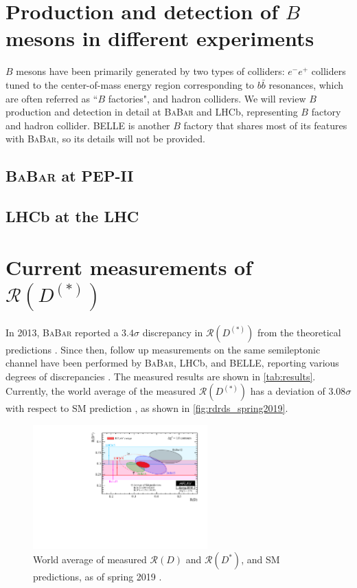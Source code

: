 \documentclass[12pt,letterpaper]{article}
\def\BaBar/{\textsc{BaBar}}
\def\RD/{\ensuremath{\mathcal{R}(D)}}
\def\RDst/{\ensuremath{\mathcal{R}(D^{*})}}
\def\RDDst/{\ensuremath{\mathcal{R}(D^{(*)})}}
\begin{document}
\section{Production and detection of $B$ mesons in different experiments}
$B$ mesons have been primarily generated by two types of colliders:
$e^- e^+$ colliders tuned to the center-of-mass energy region corresponding to
$b\bar{b}$ resonances, which are often referred as ``$B$ factories", and hadron
colliders.
We will review $B$ production and detection in detail at \BaBar/ and LHCb,
representing $B$ factory and hadron collider.
BELLE is another $B$ factory that shares most of its features with \BaBar/, so
its details will not be provided.

\subsection{\BaBar/ at PEP-II} \label{sec:babar}


\subsection{LHCb at the LHC} \label{sec:lhcb}


\section{Current measurements of \RDDst/}
In 2013, \BaBar/ reported a $3.4\sigma$ discrepancy in \RDDst/ from the
theoretical predictions \cite{Lees:2013rw}.
Since then, follow up measurements on the same semileptonic channel have been
performed by \BaBar/, LHCb, and BELLE, reporting various degrees of
discrepancies \cite{Hirose:2017185, LHCb:PhysRevLett.115.111803, Aaij:2017deq}.
The measured results are shown in \autoref{tab:results}.
Currently, the world average of the measured \RDDst/ has a deviation of
$3.08\sigma$ with respect to SM prediction \cite{HFLAV:2019}, as shown
in \autoref{fig:rdrds_spring2019}.

\begin{figure}[ht]
    \centering
    \includegraphics[width=0.6\textwidth]{figs/rdrds_spring2019.pdf}
    \caption{
        World average of measured \RD/ and \RDst/, and SM predictions, as of
        spring 2019 \cite{HFLAV:2019}.
    }
    \label{fig:rdrds_spring2019}
\end{figure}
\end{document}

